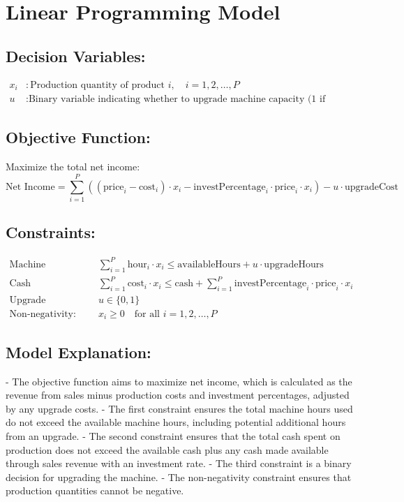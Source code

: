 \documentclass{article}
\begin{document}
\section*{Linear Programming Model}

\subsection*{Decision Variables:}

\begin{align*}
x_i &: \text{Production quantity of product } i, \quad i = 1, 2, \ldots, P \\
u &: \text{Binary variable indicating whether to upgrade machine capacity (1 if upgrade, 0 otherwise)}
\end{align*}

\subsection*{Objective Function:}

Maximize the total net income:
\[
\text{Net Income} = \sum_{i=1}^{P} \left( ( \text{price}_i - \text{cost}_i ) \cdot x_i - \text{investPercentage}_i \cdot \text{price}_i \cdot x_i \right) - u \cdot \text{upgradeCost}
\]

\subsection*{Constraints:}

\begin{align*}
\text{Machine Capacity:} & \quad \sum_{i=1}^{P} \text{hour}_i \cdot x_i \leq \text{availableHours} + u \cdot \text{upgradeHours} \\
\text{Cash Availability:} & \quad \sum_{i=1}^{P} \text{cost}_i \cdot x_i \leq \text{cash} + \sum_{i=1}^{P} \text{investPercentage}_i \cdot \text{price}_i \cdot x_i \\
\text{Upgrade Decision:} & \quad u \in \{0, 1\} \\
\text{Non-negativity:} & \quad x_i \geq 0 \quad \text{for all } i = 1, 2, \ldots, P
\end{align*}

\subsection*{Model Explanation:}

- The objective function aims to maximize net income, which is calculated as the revenue from sales minus production costs and investment percentages, adjusted by any upgrade costs.
- The first constraint ensures the total machine hours used do not exceed the available machine hours, including potential additional hours from an upgrade.
- The second constraint ensures that the total cash spent on production does not exceed the available cash plus any cash made available through sales revenue with an investment rate.
- The third constraint is a binary decision for upgrading the machine.
- The non-negativity constraint ensures that production quantities cannot be negative.
\end{document}
